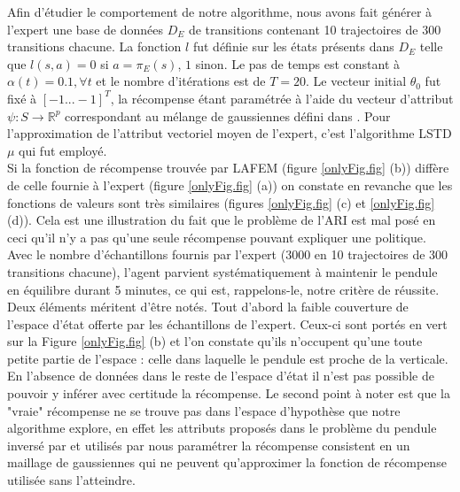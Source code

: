 \documentclass[publibook-draft]{CAp2012}
\begin{document}
Afin d'étudier le comportement de notre algorithme, nous avons fait générer à l'expert une base de données $D_E$ de transitions contenant 10 trajectoires de 300 transitions chacune. La fonction $l$ fut définie sur les états présents dans $D_E$ telle que $l(s,a) = 0$ si $a=\pi_E(s)$, $1$ sinon. Le pas de temps est constant à $\alpha(t) = 0.1, \forall t$ et le nombre d'itérations est de $T=20$. Le vecteur initial $\theta_0$ fut fixé à $[-1...-1]^T$, la récompense étant paramétrée à l'aide du vecteur d'attribut $\psi : S \rightarrow \mathbb{R}^p$ correspondant au mélange de gaussiennes défini dans \cite{lagoudakis2003least}. Pour l'approximation de l'attribut vectoriel moyen de l'expert, c'est l'algorithme LSTD$\mu$ qui fut employé.\\


Si la fonction de récompense trouvée par LAFEM (figure \ref{onlyFig.fig} (b)) diffère de celle fournie à l'expert (figure \ref{onlyFig.fig} (a)) on constate en revanche que les fonctions de valeurs sont très similaires (figures \ref{onlyFig.fig} (c) et \ref{onlyFig.fig} (d)). Cela est une illustration du fait que le problème de l'ARI est mal posé en ceci qu'il n'y a pas qu'une seule récompense pouvant expliquer une politique.\\

Avec le nombre d'échantillons fournis par l'expert (3000 en 10 trajectoires de 300 transitions chacune), l'agent parvient systématiquement à maintenir le pendule en équilibre durant 5 minutes, ce qui est, rappelons-le, notre critère de réussite.\\

Deux éléments méritent d'être notés. Tout d'abord la faible couverture de l'espace d'état offerte par les échantillons de l'expert. Ceux-ci sont portés en vert sur la Figure \ref{onlyFig.fig} (b) et l'on constate qu'ils n'occupent qu'une toute petite partie de l'espace : celle dans laquelle le pendule est proche de la verticale. En l'absence de données dans le reste de l'espace d'état il n'est pas possible de pouvoir y inférer avec certitude la récompense. Le second point à noter est que la "vraie" récompense ne se trouve pas dans l'espace d'hypothèse que notre algorithme explore, en effet les attributs proposés dans le problème du pendule inversé par \citet{lagoudakis2003least} et utilisés par nous paramétrer la récompense consistent en un maillage de gaussiennes qui ne peuvent qu'approximer la fonction de récompense utilisée sans l'atteindre.\\
\end{document}
